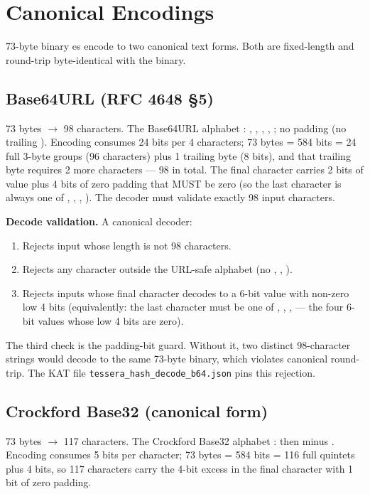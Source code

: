 \section{Canonical Encodings}
\label{sec:encodings}

73-byte binary \tesserahash{}es encode to two canonical text forms. Both are fixed-length and round-trip byte-identical with the binary.

\subsection{Base64URL (RFC 4648 §5)}

73 bytes $\to$ 98 characters. The Base64URL alphabet \citep{rfc4648}: , , , \code{-}, \code{\_}; no padding (no trailing \code{=}). Encoding consumes 24 bits per 4 characters; 73 bytes = 584 bits = 24 full 3-byte groups (96 characters) plus 1 trailing byte (8 bits), and that trailing byte requires 2 more characters --- 98 in total. The final character carries 2 bits of value plus 4 bits of zero padding that MUST be zero (so the last character is always one of , , , ). The decoder must validate exactly 98 input characters.

\textbf{Decode validation.} A canonical decoder:
\begin{enumerate}
  \item Rejects input whose length is not 98 characters.
  \item Rejects any character outside the URL-safe alphabet (no \code{+}, \code{/}, \code{=}).
  \item Rejects inputs whose final character decodes to a 6-bit value with non-zero low 4 bits (equivalently: the last character must be one of , , ,  --- the four 6-bit values whose low 4 bits are zero).
\end{enumerate}

The third check is the padding-bit guard. Without it, two distinct 98-character strings would decode to the same 73-byte binary, which violates canonical round-trip. The KAT file \texttt{tessera\_hash\_decode\_b64.json} pins this rejection.

\subsection{Crockford Base32 (canonical form)}

73 bytes $\to$ 117 characters. The Crockford Base32 alphabet \citep{crockford}:  then  minus . Encoding consumes 5 bits per character; 73 bytes = 584 bits = 116 full quintets plus 4 bits, so 117 characters carry the 4-bit excess in the final character with 1 bit of zero padding.

